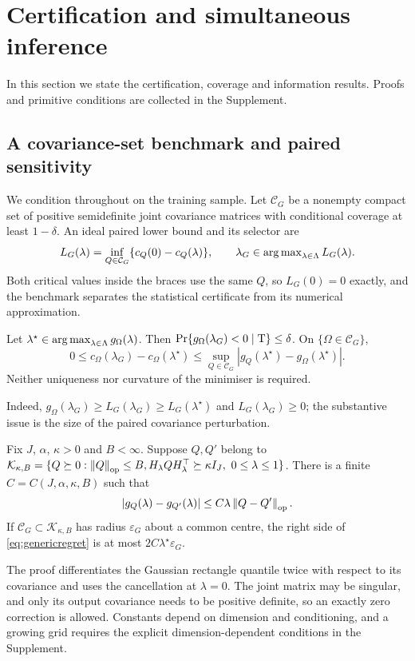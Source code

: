 \section{Certification and simultaneous inference}
In this section we state the certification, coverage and information results. Proofs and primitive conditions are collected in the Supplement.

\subsection{A covariance-set benchmark and paired sensitivity}
We condition throughout on the training sample. Let $\mathcal C_G$ be a nonempty compact set of positive semidefinite joint covariance matrices with conditional coverage at least $1-\delta$. An ideal paired lower bound and its selector are
\begin{equation}\label{eq:ideal}
 L_G(\lambda)=\inf_{Q\in\mathcal C_G}\{c_Q(0)-c_Q(\lambda)\},\qquad
 \lambda_G\in\operatorname{arg\,max}_{\lambda\in\Lambda}L_G(\lambda).
\end{equation}
Both critical values inside the braces use the same $Q$, so $L_G(0)=0$ exactly, and the benchmark separates the statistical certificate from its numerical approximation.

\begin{theorem}\label{th:ideal}
Let $\lambda^\star\in\operatorname{arg\,max}_{\lambda\in\Lambda}g_\Omega(\lambda)$. Then
$\Pr\{g_\Omega(\lambda_G)<0\mid\mathrm{T}\}\leq\delta$. On $\{\Omega\in\mathcal C_G\}$,
\begin{equation}\label{eq:genericregret}
 0\leq c_\Omega(\lambda_G)-c_\Omega(\lambda^\star)
 \leq\sup_{Q\in\mathcal C_G}|g_Q(\lambda^\star)-g_\Omega(\lambda^\star)|.
\end{equation}
Neither uniqueness nor curvature of the minimiser is required.
\end{theorem}
Indeed, $g_\Omega(\lambda_G)\geq L_G(\lambda_G)\geq L_G(\lambda^\star)$ and $L_G(\lambda_G)\geq0$; the substantive issue is the size of the paired covariance perturbation.

\begin{theorem}\label{th:sensitivity}
Fix $J$, $\alpha$, $\kappa>0$ and $B<\infty$. Suppose $Q,Q'$ belong to
$\mathcal K_{\kappa,B}=\{Q\succeq0:\norm Q_\op\leq B,
H_\lambda QH_\lambda^\top\succeq\kappa I_J,\ 0\leq\lambda\leq1\}$.
There is a finite $C=C(J,\alpha,\kappa,B)$ such that
\begin{equation}\label{eq:pairedlip}
 |g_Q(\lambda)-g_{Q'}(\lambda)|\leq C\lambda\left\lVert Q-Q'\right\rVert_{\mathrm{op}}.
\end{equation}
If $\mathcal C_G\subset\mathcal K_{\kappa,B}$ has radius $\varepsilon_G$ about a common centre, the right side of \eqref{eq:genericregret} is at most $2C\lambda^\star\varepsilon_G$.
\end{theorem}
The proof differentiates the Gaussian rectangle quantile twice with respect to its covariance and uses the cancellation at $\lambda=0$. The joint matrix may be singular, and only its output covariance needs to be positive definite, so an exactly zero correction is allowed. Constants depend on dimension and conditioning, and a growing grid requires the explicit dimension-dependent conditions in the Supplement.

